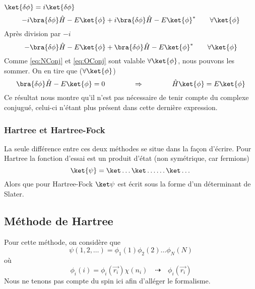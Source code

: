 $\ket{\delta\phi} = i\ket{\delta\phi}$
\begin{equation}
-i\bra{\delta\phi}\hat{H}-E\ket{\phi}+i\bra{\delta\phi}\hat{H}-E\ket{\phi}^*\qquad\forall\ket{\phi}
\end{equation}
Après division par $-i$
\begin{equation}
-\bra{\delta\phi}\hat{H}-E\ket{\phi}+\bra{\delta\phi}\hat{H}-E\ket{\phi}^*\qquad\forall\ket{\phi}
\label{eq:OConj}
\end{equation}
Comme \eqref{eq:NConj} et \eqref{eq:OConj} sont valable $\forall\ket{\phi}$, nous pouvons les sommer. 
On en tire que ($\forall\ket{\phi}$)
\begin{equation}
\bra{\delta\phi}\hat{H}-E\ket{\phi}=0\qquad\qquad\Rightarrow\qquad\qquad \hat{H}\ket{\phi}=E\ket{\phi}
\end{equation}
Ce résultat nous montre qu'il n'est pas nécessaire de tenir compte du complexe conjugué, celui-ci n'étant 
plus présent dans cette dernière expression.


\subsubsection{Hartree et Hartree-Fock}
La seule différence entre ces deux méthodes se situe dans la façon d'écrire. Pour Hartree la 
fonction d'essai est un produit d'état (non symétrique, car fermions)
\begin{equation}
\ket{\psi} = \ket\dots\ket\dots\dots \ket\dots
\end{equation}
Alors que pour Hartree-Fock $\ket\psi$ est écrit sous la forme d'un déterminant de Slater.






\subsection{Méthode de Hartree}
Pour cette méthode, on considère que
\begin{equation}
\psi(1,2,\dots)=\phi_1(1)\phi_2(2)\dots\phi_N(N)
\end{equation}
où
\begin{equation}
\phi_i(i) = \phi_i(\vec{r_i})\chi(n_i) \quad \dashrightarrow \quad\phi_i(\vec{r_i})
\end{equation}
Nous ne tenons pas compte du spin ici afin d'alléger le formalisme.\\

